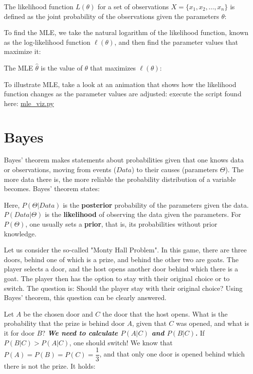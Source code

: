 The likelihood function $L(\theta)$ for a set of observations $X = \{x_1, x_2, \ldots, x_n\}$ is defined as the joint probability of the observations given the parameters $\theta$:

To find the MLE, we take the natural logarithm of the likelihood function, known as the log-likelihood function $\ell(\theta)$, and then find the parameter values that maximize it:

The MLE $\hat{\theta}$ is the value of $\theta$ that maximizes $\ell(\theta)$:

To illustrate MLE, take a look at an animation that shows how the likelihood function changes as the parameter values are adjusted: execute the script found here: \href{../scripts/mle_viz.py}{mle\_viz.py}

\section{Bayes}\label{Bayes}
Bayes' theorem makes statements about probabilities given that one knows data or observations, moving from events ($Data$) to their causes (parameters $\Theta$). The more data there is, the more reliable the probability distribution of a variable becomes. Bayes' theorem states:


Here, $P(\Theta|Data)$ is the \textbf{posterior} probability of the parameters given the data. $P(Data|\Theta)$ is the \textbf{likelihood} of observing the data given the parameters. For $P(\Theta)$, one usually sets a \textbf{prior}, that is, its probabilities without prior knowledge.

Let us consider the so-called "Monty Hall Problem". In this game, there are three doors, behind one of which is a prize, and behind the other two are goats. The player selects a door, and the host opens another door behind which there is a goat. The player then has the option to stay with their original choice or to switch. The question is: Should the player stay with their original choice? Using Bayes' theorem, this question can be clearly answered.

Let $A$ be the chosen door and $C$ the door that the host opens. What is the probability that the prize is behind door $A$, given that $C$ was opened, and what is it for door $B$? \textbf{\textit{We need to calculate $P(A|C)$ and $P(B|C)$.}} If $P(B|C) > P(A|C)$, one should switch! We know that $P(A) = P(B) = P(C) = \dfrac{1}{3}$, and that only one door is opened behind which there is not the prize. It holds:

